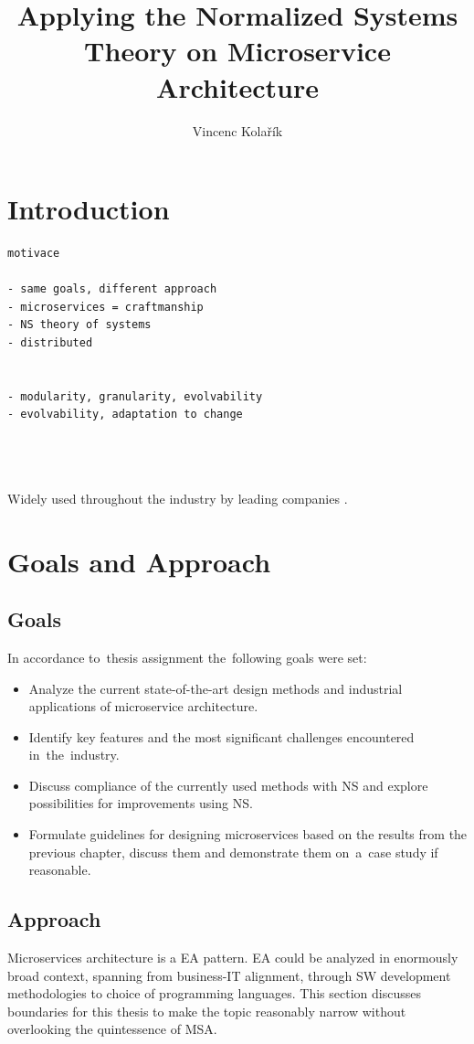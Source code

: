 \documentclass[thesis=M,english,hidelinks]{FITthesis}[2012/10/20]
\title{Applying the Normalized Systems Theory on Microservice Architecture}
\author{Vincenc Kolařík} %
\begin{document}
% 
% 
\chapter{Introduction}
\begin{verbatim}
motivace

- same goals, different approach
- microservices = craftmanship
- NS theory of systems
- distributed 


- modularity, granularity, evolvability
- evolvability, adaptation to change
    
    
    
\end{verbatim}

Widely used throughout the industry by leading companies \cite{ms-who-is-using}.


% 
% 
\chapter{Goals and Approach}
\section{Goals}
In accordance to~thesis assignment the~following goals were set:
\begin{itemize}
	\item Analyze the current state-of-the-art design methods and industrial applications of microservice architecture.
	\item Identify key features and the most significant challenges encountered in~the~industry.
	\item Discuss compliance of the currently used methods with \acrlong{NS} and explore possibilities for improvements using \acrshort{NS}. 
	\item Formulate guidelines for designing microservices based on the results from the previous chapter, discuss them and demonstrate them on~a~case study if reasonable.
\end{itemize}

\section{Approach}
Microservices architecture is a \acrfull{EA} pattern. \acrshort{EA} could be analyzed in enormously broad context, spanning from business-IT alignment, through \acrshort{SW} development methodologies to choice of programming languages. This section discusses boundaries for this thesis to make the topic reasonably narrow without overlooking the quintessence of \acrlong{MSA}.
\end{document}
